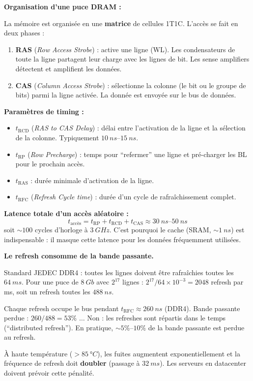 \documentclass[12pt,a4paper,twoside]{book}
\begin{document}
\begin{formule}
\textbf{Organisation d'une puce DRAM :}

La mémoire est organisée en une \textbf{matrice} de cellules 1T1C. L'accès se fait en deux phases :
\begin{enumerate}[nosep]
\item \textbf{RAS} (\textit{Row Access Strobe}) : active une ligne (WL). Les condensateurs de toute la ligne partagent leur charge avec les lignes de bit. Les sense amplifiers détectent et amplifient les données.
\item \textbf{CAS} (\textit{Column Access Strobe}) : sélectionne la colonne (le bit ou le groupe de bits) parmi la ligne activée. La donnée est envoyée sur le bus de données.
\end{enumerate}

\textbf{Paramètres de timing :}
\begin{itemize}[nosep]
\item $t_{\text{RCD}}$ (\textit{RAS to CAS Delay}) : délai entre l'activation de la ligne et la sélection de la colonne. Typiquement $\SI{10}{ns}$--$\SI{15}{ns}$.
\item $t_{\text{RP}}$ (\textit{Row Precharge}) : temps pour ``refermer'' une ligne et pré-charger les BL pour le prochain accès.
\item $t_{\text{RAS}}$ : durée minimale d'activation de la ligne.
\item $t_{\text{RFC}}$ (\textit{Refresh Cycle time}) : durée d'un cycle de rafraîchissement complet.
\end{itemize}

\textbf{Latence totale d'un accès aléatoire :}
\[
t_{\text{accès}} = t_{\text{RP}} + t_{\text{RCD}} + t_{\text{CAS}} \approx \SI{30}{ns}\text{--}\SI{50}{ns}
\]
soit $\sim 100$ cycles d'horloge à $\SI{3}{GHz}$. C'est pourquoi le cache (SRAM, $\sim\SI{1}{ns}$) est indispensable : il masque cette latence pour les données fréquemment utilisées.
\end{formule}

\begin{attention}
\textbf{Le refresh consomme de la bande passante.}

Standard JEDEC DDR4 : toutes les lignes doivent être rafraîchies toutes les $\SI{64}{ms}$. Pour une puce de $\SI{8}{Gb}$ avec $2^{17}$ lignes : $2^{17}/64\times10^{-3} = 2048$ refresh par ms, soit un refresh toutes les $\SI{488}{ns}$.

Chaque refresh occupe le bus pendant $t_{\text{RFC}} \approx \SI{260}{ns}$ (DDR4). Bande passante perdue : $260/488 = 53\%$ $\ldots$ Non : les refreshes sont répartis dans le temps (``distributed refresh''). En pratique, $\sim 5\%$--$10\%$ de la bande passante est perdue au refresh.

À haute température ($> \SI{85}{°C}$), les fuites augmentent exponentiellement et la fréquence de refresh doit \textbf{doubler} (passage à $\SI{32}{ms}$). Les serveurs en datacenter doivent prévoir cette pénalité.
\end{attention}
\end{document}
